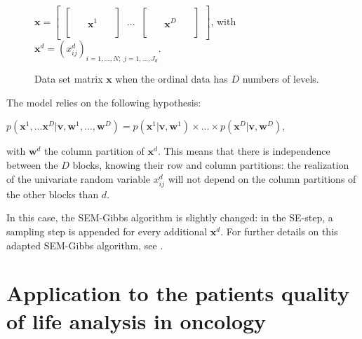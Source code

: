 \begin{figure}
    \centering
    $
    \boldsymbol{x} = 
      \begin{bmatrix} 
        \begin{bmatrix} 
          \;\; & \;\; & \;\;\\ 
          \;\; & \;\; & \;\;\\ 
          \;\; & \boldsymbol{x}^1 &  \;\; \\
          \;\; & \;\; & \;\; \\
          \;\; & \;\; & \;\;
        \end{bmatrix}
        \;\; ... \;\;
        \begin{bmatrix} 
          \;\; & \;\; & \;\;\\ 
          \;\; & \;\; & \;\;\\ 
          \;\; & \boldsymbol{x}^D &  \;\; \\
          \;\; & \;\; & \;\; \\
          \;\; & \;\; & \;\;
        \end{bmatrix}
      \end{bmatrix}
    $,
    with $\boldsymbol{x}^d = \left(x^d_{ij}\right)_{i=1,...,N; \; j=1,...,J_d}$.
    \caption{Data set matrix $\boldsymbol{x}$ when the ordinal data has $D$ numbers of levels.}
    \label{fig:mat-diff-m}
\end{figure}


\noindent The model relies on the following hypothesis:

\begin{center}
  $
  p\left(\boldsymbol{x}^1,...\boldsymbol{x}^D|\boldsymbol{v},\boldsymbol{w}^1,...,\boldsymbol{w}^D\right) = p\left(\boldsymbol{x}^1|\boldsymbol{v},\boldsymbol{w}^1\right) \times ... \times p\left(\boldsymbol{x}^D|\boldsymbol{v},\boldsymbol{w}^D\right)
  $,
\end{center}
\noindent with $\boldsymbol{w}^d$ the column partition of $\boldsymbol{x}^d$. This means that there is independence between the $D$ blocks, knowing their row and column partitions: the realization of the univariate random variable $x^d_{ij}$ will not depend on the column partitions of the other blocks than $d$.

In this case, the SEM-Gibbs algorithm is slightly changed: in the SE-step, a sampling step is appended for every additional $\boldsymbol{x}^d$. For further details on this adapted SEM-Gibbs algorithm, see \citet{Selosse18}.
  
\section{Application to the patients quality of life analysis in oncology}
\label{sec:appli}

